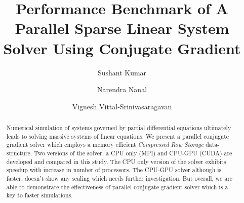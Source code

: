 \documentclass[sigplan,screen]{acmart}
\begin{document}
\title{Performance Benchmark of A Parallel Sparse Linear System Solver Using Conjugate Gradient}

\author{Sushant Kumar}
\authornotemark[1]

\author{Narendra Nanal}
\authornotemark[2]

\author{Vignesh Vittal-Srinivasaragavan}
\authornotemark[3]


\begin{abstract}
	Numerical simulation of systems governed by partial differential equations ultimately leads to solving massive systems of linear equations. We present a parallel conjugate gradient solver which employs a memory efficient \emph{Compressed Row Storage} data-structure. Two versions of the solver, a CPU only (MPI) and CPU-GPU (CUDA) are developed and compared in this study. The CPU only version of the solver exhibits speedup with increase in number of processors. The CPU-GPU solver although is faster, doesn't show any scaling which needs further investigation. But overall, we are able to demonstrate the effectiveness of parallel conjugate gradient solver which is a key to faster simulations.  
\end{abstract}

%
\end{document}
